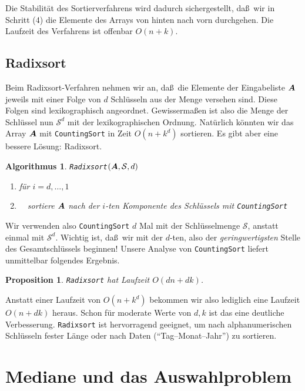 \documentclass[10pt,reqno]{amsart}
\numberwithin{equation}{section}
\newcommand\cS{\mathcal S}
\newcommand\vA{\vec A}
\def\vec#1{\mathchoice{\mbox{\boldmath$\displaystyle#1$}}
{\mbox{\boldmath$\textstyle#1$}}
{\mbox{\boldmath$\scriptstyle#1$}}
{\mbox{\boldmath$\scriptscriptstyle#1$}}}
\newtheorem{proposition}[definition]{Proposition}
\newtheorem{algorithm}[definition]{Algorithmus}
\begin{document}
Die Stabilit\"at des Sortierverfahrens wird dadurch sichergestellt, da\ss\ wir in Schritt (4) die Elemente des Arrays von hinten nach vorn durchgehen.
Die Laufzeit des Verfahrens ist offenbar $O(n+k)$.

\subsection{Radixsort}\label{sec_radixsort}
Beim Radixsort-Verfahren nehmen wir an, da\ss\ die Elemente der Eingabeliste $\vA$ jeweils mit einer Folge von $d$ Schl\"usseln aus der Menge versehen sind.
Diese Folgen sind lexikographisch angeordnet.
Gewisserma\ss en ist also die Menge der Schl\"ussel nun $\cS^d$ mit der lexikographischen Ordnung.
Nat\"urlich k\"onnten wir das Array $\vA$ mit {\tt CountingSort} in Zeit $O(n+k^d)$ sortieren.
Es gibt aber eine bessere L\"osung: Radixsort.

\begin{algorithm}{\tt Radixsort$(\vA,\cS,d)$}
	\begin{enumerate}
		\item f\"ur $i=d,\ldots,1$
		\item $\quad$sortiere $\vA$ nach der $i$-ten Komponente des Schl\"ussels mit {\tt CountingSort}
	\end{enumerate}
\end{algorithm}

Wir verwenden also {\tt CountingSort} $d$ Mal mit der Schl\"usselmenge $\cS$, anstatt einmal mit $\cS^d$.
Wichtig ist, da\ss\ wir mit der $d$-ten, also der {\em geringwertigsten} Stelle des Gesamtschl\"ussels beginnen!
Unsere Analyse von {\tt CountingSort} liefert unmittelbar folgendes Ergebnis.

\begin{proposition}\label{prop_radix}
	{\tt Radixsort} hat Laufzeit $O(dn+dk)$.
\end{proposition}

Anstatt einer Laufzeit von $O(n+k^d)$ bekommen wir also lediglich eine Laufzeit $O(n+dk)$ heraus.
Schon f\"ur moderate Werte von $d,k$ ist das eine deutliche Verbesserung.
{\tt Radixsort} ist hervorragend geeignet, um nach alphanumerischen Schl\"usseln fester L\"ange oder nach Daten (``Tag--Monat--Jahr'') zu sortieren.

\section{Mediane und das Auswahlproblem}\label{sec_select}
\end{document}
